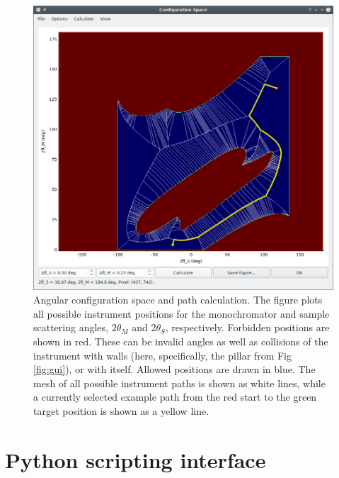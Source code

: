 \begin{figure}[htb]
		\begin{center}
			\includegraphics[width = 0.75 \textwidth]{figures/gui_configspace}
		\end{center}
	\caption[Configuration space dialog.]{Angular configuration space and path calculation.
	The figure plots all possible instrument positions for the monochromator and sample
	scattering angles, $2\theta_M$ and $2\theta_S$, respectively. Forbidden positions
	are shown in red.
	These can be invalid angles as well as collisions of the instrument with walls
	(here, specifically, the pillar from Fig \ref{fig:gui}), or with itself.
	Allowed positions are drawn in blue. The mesh of all possible instrument
	paths is shown as white lines, while a currently selected example path from
	the red start to the green target position is shown as a yellow line.
		\label{fig:gui_configspace}}
\end{figure}





\section{Python scripting interface}
\label{sec:scripting}

